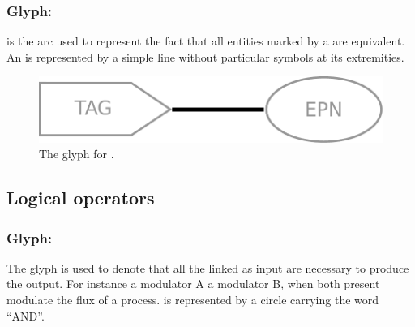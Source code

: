 \subsubsection{Glyph:  }\label{sec:equivalenceArc}

 is the arc used to represent the fact that all entities
marked by a  are equivalent. An  is represented by a simple line without particular symbols at its extremities.

\begin{figure}[htb]
  \centering
  \includegraphics[scale = 0.4]{le_images/equivalence}
  \caption{The \PD glyph for .}
  \label{fig:equivalence}
\end{figure}




\subsection{Logical operators}\label{sec:logic}

\subsubsection{Glyph: }\label{sec:and}

The glyph  is used to denote that all the  linked as input are necessary to produce the output. For instance a modulator A  a modulator B, when both present modulate the flux of a process.  is represented by a circle carrying the word ``AND''.

